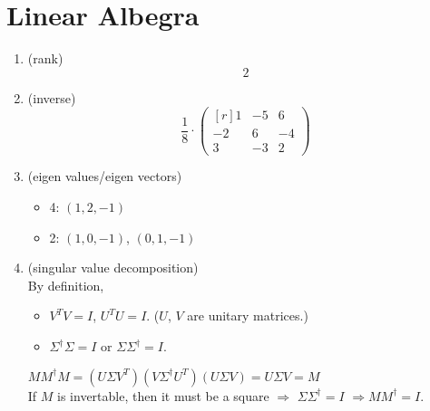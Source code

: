 \renewcommand{\vec}[1]{\mathbf{#1}}

\section{Linear Albegra}
\begin{enumerate}[(1)]
	\item (rank) \\
		\[ 2 \]
	\item (inverse) \\
		\[
			\frac{1}{8} \cdot
			\begin{pmatrix*}[r]
				1 & -5 & 6 \\
				-2 & 6 & -4 \\
				3 & -3 & 2
			\end{pmatrix*}
		\]
	\item (eigen values/eigen vectors)
		\begin{itemize}
			\item 4: $(1, 2, -1)$
			\item 2: $(1, 0, -1)$, $(0, 1, -1)$
		\end{itemize}
	\item (singular value decomposition) \\
		By definition,
		\begin{itemize}
			\item $V^T V=I$, $U^T U=I$. ($U$, $V$ are unitary matrices.)
			\item $\Sigma^{\dagger}\Sigma=I$ or $\Sigma\Sigma^{\dagger}=I$.
		\end{itemize}
		$MM^{\dagger}M = (U\Sigma V^T)(V\Sigma^{\dagger}U^T)(U\Sigma V) = U\Sigma V = M$ \\
		If $M$ is invertable, then it must be a square $\Rightarrow$ $\Sigma\Sigma^{\dagger}=I$ $\Rightarrow MM^{\dagger}=I$.


\end{enumerate}
